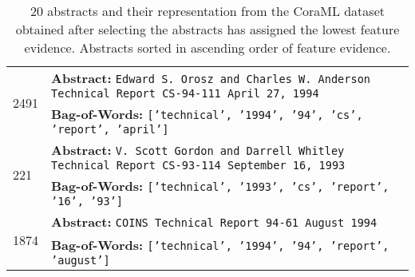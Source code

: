 \begin{table}[!h]
{\begin{tabular}{p{1cm} p{12cm}}
             \midrule
             
             \multirow{2}{*}{2491} &  \textbf{Abstract:} {\tt Edward S. Orosz and Charles W. Anderson Technical Report CS-94-111 April 27, 1994} \\
             & \textbf{Bag-of-Words:} {\tt ['technical', '1994', '94', 'cs', 'report', 'april']} \\
             
             \midrule
             
             \multirow{2}{*}{221} &  \textbf{Abstract:} {\tt V. Scott Gordon and Darrell Whitley Technical Report CS-93-114 September 16, 1993} \\
             & \textbf{Bag-of-Words:} {\tt ['technical', '1993', 'cs', 'report', '16', '93']} \\
             
             \midrule
             
             \multirow{2}{*}{1874} & \textbf{Abstract:} {\tt COINS Technical Report 94-61 August 1994} \\
             & \textbf{Bag-of-Words:} {\tt ['technical', '1994', '94', 'report', 'august']} \\
             \bottomrule
        \end{tabular}
    }
    \vspace{5mm}
    \caption{20 abstracts and their representation from the CoraML dataset obtained after selecting the abstracts \GPNacro{} has assigned the lowest feature evidence. Abstracts sorted in ascending order of feature evidence.}
    \label{tab:lowest_evidence_abstracts}
\end{table}
